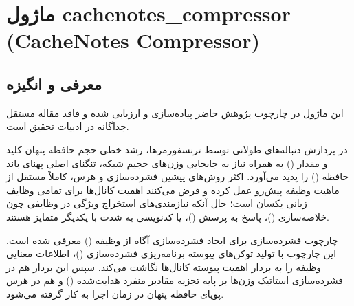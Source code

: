 \section{ماژول cachenotes\_compressor (CacheNotes Compressor)}
\label{sec:module_cachenotes_compressor}

\subsection{معرفی و انگیزه}
این ماژول در چارچوب پژوهش حاضر پیاده‌سازی و ارزیابی شده و فاقد مقاله مستقل جداگانه در ادبیات تحقیق است.

در پردازش دنباله‌های طولانی توسط ترنسفورمرها، رشد خطی حجم حافظه پنهان کلید و مقدار () به همراه نیاز به جابجایی وزن‌های حجیم شبکه، تنگنای اصلی پهنای باند حافظه () را پدید می‌آورد. اکثر روش‌های پیشین فشرده‌سازی و هرس، کاملاً مستقل از ماهیت وظیفه پیش‌رو عمل کرده و فرض می‌کنند اهمیت کانال‌ها برای تمامی وظایف زبانی یکسان است؛ حال آنکه نیازمندی‌های استخراج ویژگی در وظایفی چون خلاصه‌سازی ()، پاسخ به پرسش ()، یا کدنویسی به شدت با یکدیگر متمایز هستند.

چارچوب فشرده‌سازی  برای ایجاد فشرده‌سازی آگاه از وظیفه () معرفی شده است. این چارچوب با تولید توکن‌های پیوسته برنامه‌ریزی فشرده‌سازی ()، اطلاعات معنایی وظیفه را به بردار اهمیت پیوسته کانال‌ها نگاشت می‌کند. سپس این بردار هم در فشرده‌سازی استاتیک وزن‌ها بر پایه تجزیه مقادیر منفرد هدایت‌شده () و هم در هرس پویای حافظه پنهان  در زمان اجرا به کار گرفته می‌شود.

